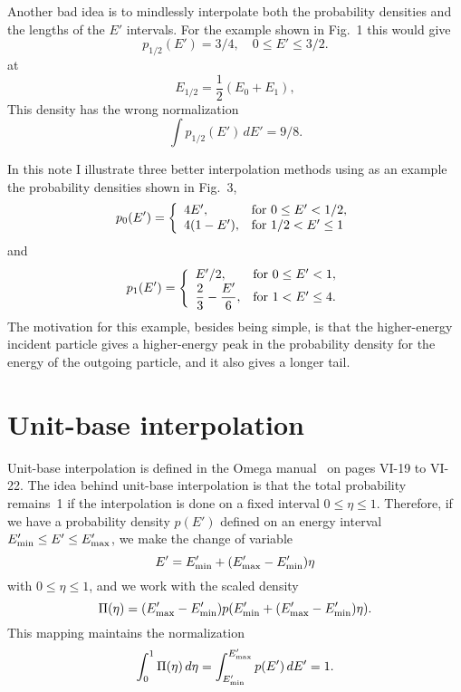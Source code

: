 \documentclass[11pt]{article}
\begin{document}
\begin{figure}

\end{figure}

Another bad idea is to mindlessly interpolate both the probability
densities and the lengths of the $E'$ intervals.  For the example
shown in Fig.~1 this would give
\[
  p_{1/2}(E') = 3/4, \quad 0 \le E' \le 3/2.
\]
at
\[
  E_{1/2} = \frac{1}{2}(E_0 + E_1),
\]
This density has the wrong normalization
\[
  \int p_{1/2}(E') \, dE' = 9/8.
\]

In this note I illustrate three better interpolation
methods using as an example the probability densities shown 
in Fig.~3,
\begin{equation}
  p_0(E') = \left\{
    \begin{array}{ll}
       4E', & \hbox{for $0 \le E' < 1/2$}, \\
       4(1 - E'), & \hbox{for $1/2 < E' \le 1$}
    \end{array}
  \right.
  \label{p0def}
\end{equation}
and
\begin{equation}
  p_1(E') = \left\{
    \begin{array}{ll}
      E'/2, & \hbox{for $0 \le E' < 1$}, \\
      {\displaystyle \frac{2}{3} - \frac{E'}{6},}
        & \hbox{for $1 < E' \le 4$}.
    \end{array}
  \right.
  \label{p1def}
\end{equation}
The motivation for this example, besides being simple, is that the 
higher-energy incident particle gives a higher-energy peak in
the probability density
for the energy of the outgoing particle, and it also gives a longer tail.

\begin{figure}

\end{figure}

\section{Unit-base interpolation}
Unit-base interpolation is defined in the Omega manual~\cite{Omega}
on pages VI-19 to VI-22.
The idea behind unit-base interpolation is that the total
probability remains~1 if the interpolation is done on a fixed interval
$0 \le \eta \le 1$.  Therefore, if we have a probability density 
$p(E')$ defined on
an energy interval $E'_{\rm min} \le E' \le E'_{\rm max}$, we make the change
of variable 
\begin{equation}
  E' = E'_{\rm min} + (E'_{\rm max} - E'_{\rm min}) \eta
  \label{Emap}
\end{equation}
 with $0 \le \eta \le 1$,
and we work with the scaled density
\begin{equation}
  \Pi(\eta) = (E'_{\rm max} - E'_{\rm min}) 
     p( E'_{\rm min} + (E'_{\rm max} - E'_{\rm min}) \eta ).
  \label{pmap}
\end{equation}
This mapping maintains the normalization
\[
  \int_0^1 \Pi(\eta) \, d\eta = 
    \int_{E'_{\rm min}}^{E'_{\rm max}} p(E')\, dE' = 1.
\]
\end{document}
